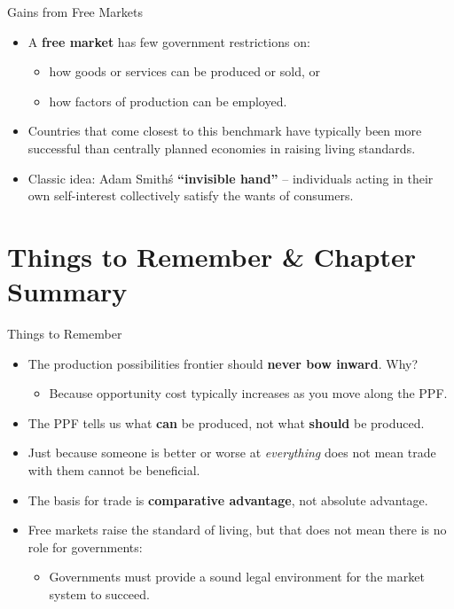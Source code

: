 \documentclass[aspectratio=169]{beamer}
\begin{document}
\begin{frame}{Gains from Free Markets}
\transfade
\begin{itemize}[<+->]
  \item A \textbf{free market} has few government restrictions on:
  \begin{itemize}[<+->]
    \item how goods or services can be produced or sold, or
    \item how factors of production can be employed.
  \end{itemize}
  \item Countries that come closest to this benchmark have typically been more successful than centrally planned economies in raising living standards.
  \item Classic idea: Adam Smith\'s \textbf{``invisible hand''} -- individuals acting in their own self-interest collectively satisfy the wants of consumers.
\end{itemize}
\end{frame}

\section{Things to Remember \& Chapter Summary}

\begin{frame}{Things to Remember}
\transfade
\begin{itemize}[<+->]
  \item The production possibilities frontier should \textbf{never bow inward}. Why?
    \begin{itemize}[<+->]
      \item Because opportunity cost typically increases as you move along the PPF.
    \end{itemize}
  \item The PPF tells us what \textbf{can} be produced, not what \textbf{should} be produced.
  \item Just because someone is better or worse at \emph{everything} does not mean trade with them cannot be beneficial.
  \item The basis for trade is \textbf{comparative advantage}, not absolute advantage.
  \item Free markets raise the standard of living, but that does not mean there is no role for governments:
    \begin{itemize}[<+->]
      \item Governments must provide a sound legal environment for the market system to succeed.
    \end{itemize}
\end{itemize}
\end{frame}
\end{document}
